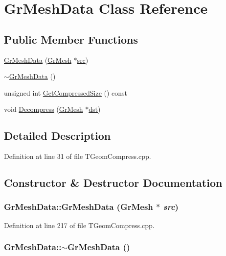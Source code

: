 \hypertarget{class_gr_mesh_data}{
\section{GrMeshData Class Reference}
\label{class_gr_mesh_data}
}
\subsection*{Public Member Functions}
\begin{CompactItemize}
\item 
\hyperlink{class_gr_mesh_data_d206ce82b75c0713075becf10f3d9aba}{GrMeshData} (\hyperlink{class_gr_mesh}{GrMesh} $\ast$\hyperlink{glext__bak_8h_72e0fdf0f845ded60b1fada9e9195cd7}{src})
\item 
\hyperlink{class_gr_mesh_data_00245905b7cd8fc9dee433bcc02a877e}{$\sim$GrMeshData} ()
\item 
unsigned int \hyperlink{class_gr_mesh_data_24dcddc711188a114ce2b6ceec692320}{GetCompressedSize} () const 
\item 
void \hyperlink{class_gr_mesh_data_63403cc06dd05ce7e08e51c67ce0f1bc}{Decompress} (\hyperlink{class_gr_mesh}{GrMesh} $\ast$\hyperlink{glext__bak_8h_92034251bfd455d524a9b5610cddba00}{dst})
\end{CompactItemize}


\subsection{Detailed Description}


Definition at line 31 of file TGeomCompress.cpp.

\subsection{Constructor \& Destructor Documentation}
\hypertarget{class_gr_mesh_data_d206ce82b75c0713075becf10f3d9aba}{
\subsubsection[{GrMeshData}]{\setlength{\rightskip}{0pt plus 5cm}GrMeshData::GrMeshData ({\bf GrMesh} $\ast$ {\em src})}}
\label{class_gr_mesh_data_d206ce82b75c0713075becf10f3d9aba}




Definition at line 217 of file TGeomCompress.cpp.\hypertarget{class_gr_mesh_data_00245905b7cd8fc9dee433bcc02a877e}{
\subsubsection[{$\sim$GrMeshData}]{\setlength{\rightskip}{0pt plus 5cm}GrMeshData::$\sim$GrMeshData ()}}
\label{class_gr_mesh_data_00245905b7cd8fc9dee433bcc02a877e}




